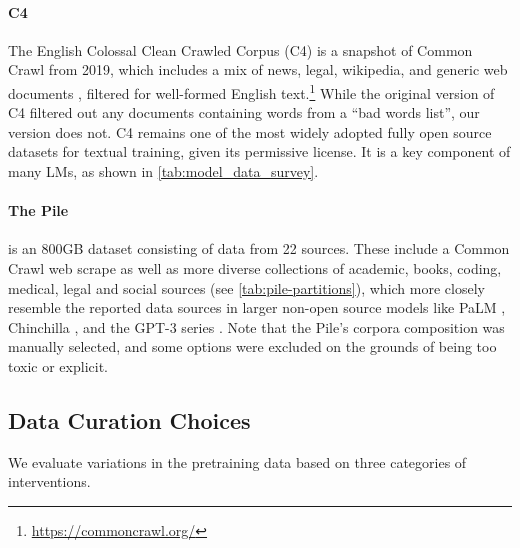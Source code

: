 \documentclass{article}
\begin{document}
\vspace{-3mm}
\paragraph{C4 \citep{raffel2020exploring}} The English Colossal Clean Crawled Corpus (C4) is a snapshot of Common Crawl from 2019, which includes a mix of news, legal, wikipedia, and generic web documents \citep{dodge2021documenting}, filtered for well-formed English text.\footnote{\url{https://commoncrawl.org/}}
While the original version of C4 filtered out any documents containing words from a ``bad words list'', our version does not.
C4 remains one of the most widely adopted fully open source datasets for textual training, given its permissive license.
It is a key component of many LMs, as shown in \cref{tab:model_data_survey}.

\vspace{-3mm}
\paragraph{The Pile \citep{gao2020pile}} is an 800GB dataset consisting of data from 22 sources.
These include a Common Crawl web scrape as well as more diverse collections of academic, books, coding, medical, legal and social sources (see \cref{tab:pile-partitions}), which more closely resemble the reported data sources in larger non-open source models like PaLM \citep{chowdhery2022palm}, Chinchilla \citep{hoffmann2022training}, and the GPT-3 series \citep{brown2020language}.
Note that the Pile's corpora composition was manually selected, and some options were excluded on the grounds of being too toxic or explicit.

\vspace{-3mm}
\subsection{Data Curation Choices}
\label{sec:data-filters}

We evaluate variations in the pretraining data based on three categories of interventions.

\vspace{-3mm}
\end{document}
